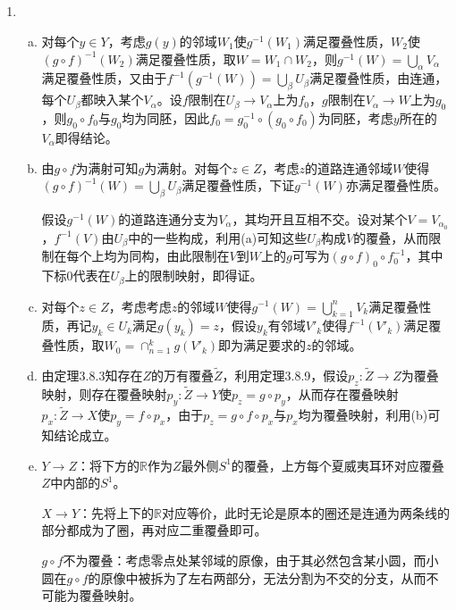 \documentclass[a4paper,UTF8,fontset=windows]{ctexart}
\begin{document}
\subsection{}
\begin{enumerate}[(1)]
    \item
    \begin{enumerate}[(a)]
    \item
    对每个$y\in Y$，考虑$g(y)$的邻域$W_1$使$g^{-1}(W_1)$满足覆叠性质，$W_2$使$(g\circ f)^{-1}(W_2)$满足覆叠性质，取$W=W_1\cap W_2$，则$g^{-1}(W)=\bigcup_\alpha V_\alpha$满足覆叠性质，又由于$f^{-1}(g^{-1}(W))=\bigcup_\beta U_\beta$满足覆叠性质，由连通，每个$U_\beta$都映入某个$V_\alpha$。设$f$限制在$U_\beta\to V_\alpha$上为$f_0$，$g$限制在$V_\alpha\to W$上为$g_0$，则$g_0\circ f_0$与$g_0$均为同胚，因此$f_0=g_0^{-1}\circ(g_0\circ f_0)$为同胚，考虑$y$所在的$V_\alpha$即得结论。
    
    \item
    由$g\circ f$为满射可知$g$为满射。对每个$z\in Z$，考虑$z$的道路连通邻域$W$使得$(g\circ f)^{-1}(W)=\bigcup_\beta U_\beta$满足覆叠性质，下证$g^{-1}(W)$亦满足覆叠性质。
    
    假设$g^{-1}(W)$的道路连通分支为$V_\alpha$，其均开且互相不交。设对某个$V=V_{\alpha_0}$，$f^{-1}(V)$由$U_\beta$中的一些构成，利用(a)可知这些$U_\beta$构成$V$的覆叠，从而限制在每个上均为同构，由此限制在$V$到$W$上的$g$可写为$(g\circ f)_0\circ f_0^{-1}$，其中下标0代表在$U_\beta$上的限制映射，即得证。
    
    \item
    对每个$z\in Z$，考虑考虑$z$的邻域$W$使得$g^{-1}(W)=\bigcup_{k=1}^nV_k$满足覆叠性质，再记$y_k\in U_k$满足$g(y_k)=z$，假设$y_k$有邻域$V'_k$使得$f^{-1}(V'_k)$满足覆叠性质，取$W_0=\cap_{n=1}^k g(V'_k)$即为满足要求的$z$的邻域。
    
    \item
    由定理3.8.3知存在$Z$的万有覆叠$\tilde{Z}$，利用定理3.8.9，假设$p_z:\tilde{Z}\to Z$为覆叠映射，则存在覆叠映射$p_y:\tilde{Z}\to Y$使$p_z=g\circ p_y$，从而存在覆叠映射$p_x:\tilde{Z}\to X$使$p_y=f\circ p_x$，由于$p_z=g\circ f\circ p_x$与$p_x$均为覆叠映射，利用(b)可知结论成立。
    
    \item
    $Y\to Z$：将下方的$\mathbb{R}$作为$Z$最外侧$S^1$的覆叠，上方每个夏威夷耳环对应覆叠$Z$中内部的$S^1$。
    
    $X\to Y$：先将上下的$\mathbb{R}$对应等价，此时无论是原本的圈还是连通为两条线的部分都成为了圈，再对应二重覆叠即可。
    
    $g\circ f$不为覆叠：考虑零点处某邻域的原像，由于其必然包含某小圆，而小圆在$g\circ f$的原像中被拆为了左右两部分，无法分割为不交的分支，从而不可能为覆叠映射。
    \end{enumerate} 
    

\end{enumerate}
\end{document}
